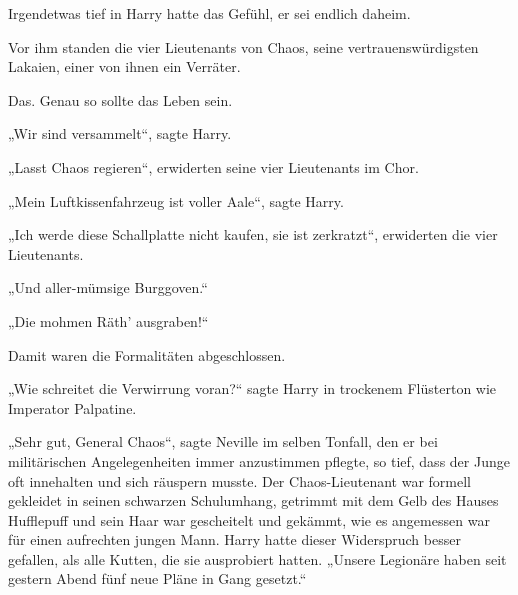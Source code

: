 Irgendetwas tief in Harry hatte das Gefühl, er sei endlich daheim.

Vor ihm standen die vier Lieutenants von Chaos, seine vertrauenswürdigsten Lakaien, einer von ihnen ein Verräter.

Das. Genau so sollte das Leben sein.

„Wir sind versammelt“, sagte Harry.

„Lasst Chaos regieren“, erwiderten seine vier Lieutenants im Chor.

„Mein Luftkissenfahrzeug ist voller Aale“, sagte Harry.

„Ich werde diese Schallplatte nicht kaufen, sie ist zerkratzt“, erwiderten die vier Lieutenants.

„Und aller-mümsige Burggoven.“

„Die mohmen Räth' ausgraben!“

Damit waren die Formalitäten abgeschlossen.

„Wie schreitet die Verwirrung voran?“ sagte Harry in trockenem Flüsterton wie Imperator Palpatine.

„Sehr gut, General Chaos“, sagte Neville im selben Tonfall, den er bei militärischen Angelegenheiten immer anzustimmen pflegte, so tief, dass der Junge oft innehalten und sich räuspern musste. Der Chaos-Lieutenant war formell gekleidet in seinen schwarzen Schulumhang, getrimmt mit dem Gelb des Hauses Hufflepuff und sein Haar war gescheitelt und gekämmt, wie es angemessen war für einen aufrechten jungen Mann. Harry hatte dieser Widerspruch besser gefallen, als alle Kutten, die sie ausprobiert hatten. „Unsere Legionäre haben seit gestern Abend fünf neue Pläne in Gang gesetzt.“

